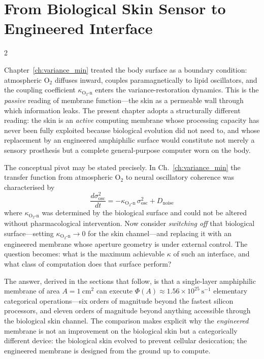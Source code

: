 \section{From Biological Skin Sensor to Engineered Interface}
\label{sec:ch11_pivot}

\begin{multicols}{2}

Chapter~\ref{ch:variance_min} treated the body surface as a boundary condition: atmospheric O$_2$ diffuses inward, couples paramagnetically to lipid oscillators, and the coupling coefficient $\kappa_{\mathrm{O_2\text{-}n}}$ enters the variance-restoration dynamics. This is the \emph{passive} reading of membrane function---the skin as a permeable wall through which information leaks. The present chapter adopts a structurally different reading: the skin is an \emph{active} computing membrane whose processing capacity has never been fully exploited because biological evolution did not need to, and whose replacement by an engineered amphiphilic surface would constitute not merely a sensory prosthesis but a complete general-purpose computer worn on the body.

The conceptual pivot may be stated precisely. In Ch.~\ref{ch:variance_min} the transfer function from atmospheric O$_2$ to neural oscillatory coherence was characterised by
\begin{equation}
\frac{d\sigma^2_{\mathrm{osc}}}{dt} = -\kappa_{\mathrm{O_2\text{-}n}}\,\sigma^2_{\mathrm{osc}} + D_{\mathrm{noise}}
\label{eq:ch11_skin_passive}
\end{equation}
where $\kappa_{\mathrm{O_2\text{-}n}}$ was determined by the biological surface and could not be altered without pharmacological intervention. Now consider \emph{switching off} that biological surface---setting $\kappa_{\mathrm{O_2\text{-}n}} \to 0$ for the skin channel---and replacing it with an engineered membrane whose aperture geometry is under external control. The question becomes: what is the maximum achievable $\kappa$ of such an interface, and what class of computation does that surface perform?

The answer, derived in the sections that follow, is that a single-layer amphiphilic membrane of area $A = 1\ \mathrm{cm}^2$ can execute $\Phi(A) \approx 1.56 \times 10^{25}\ \mathrm{s}^{-1}$ elementary categorical operations---six orders of magnitude beyond the fastest silicon processors, and eleven orders of magnitude beyond anything accessible through the biological skin channel. The comparison makes explicit why the \emph{engineered} membrane is not an improvement on the biological skin but a categorically different device: the biological skin evolved to prevent cellular desiccation; the engineered membrane is designed from the ground up to compute.


\end{multicols}
